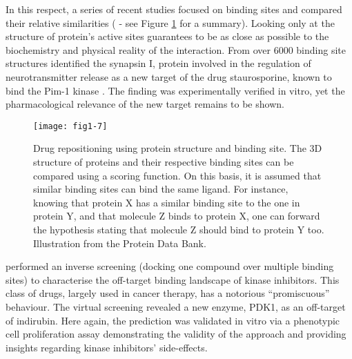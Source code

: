 In this respect, a series of recent studies focused on binding sites and compared their relative similarities (\cite{haupt2011old} - see Figure \ref{fig1-7} for a summary). Looking only at the structure of protein’s active sites guarantees to be as close as possible to the biochemistry and physical reality of the interaction. From over 6000 binding site structures \cite{de2010binding} identified the synapsin I, protein involved in the regulation of neurotransmitter release as a new target of the drug staurosporine, known to bind the Pim-1 kinase \citep{de2010binding}. The finding was experimentally verified in vitro, yet the pharmacological relevance of the new target remains to be shown.

\begin{figure}[ht]
    \centering
    \texttt{[image: fig1-7]}
    \caption{Drug repositioning using protein structure and binding site. The 3D structure of proteins and their respective binding sites can be compared using a scoring function. On this basis, it is assumed that similar binding sites can bind the same ligand. For instance, knowing that protein X has a similar binding site to the one in protein Y, and that molecule Z binds to protein X, one can forward the hypothesis stating that molecule Z should bind to protein Y too. Illustration from the Protein Data Bank.}
    \label{fig1-7}
\end{figure}

\cite{zahler2007inverse} performed an inverse screening (docking one compound over multiple binding sites) to characterise the off-target binding landscape of kinase inhibitors. This class of drugs, largely used in cancer therapy, has a notorious “promiscuous” behaviour. The virtual screening revealed a new enzyme, PDK1, as an off-target of indirubin. Here again, the prediction was validated in vitro via a phenotypic cell proliferation assay demonstrating the validity of the approach and providing insights regarding kinase inhibitors’ side-effects.

